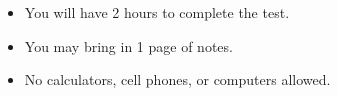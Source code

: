 \documentclass[11pt,fleqn]{article}
\begin{document}
\begin{itemize}

\item You will have 2 hours to complete the test.

\item You may bring in 1 page of notes. 
\item No calculators, cell phones, or computers allowed. 

\end{itemize}




 

\newpage
\vspace*{-0.4in}
\end{document}
